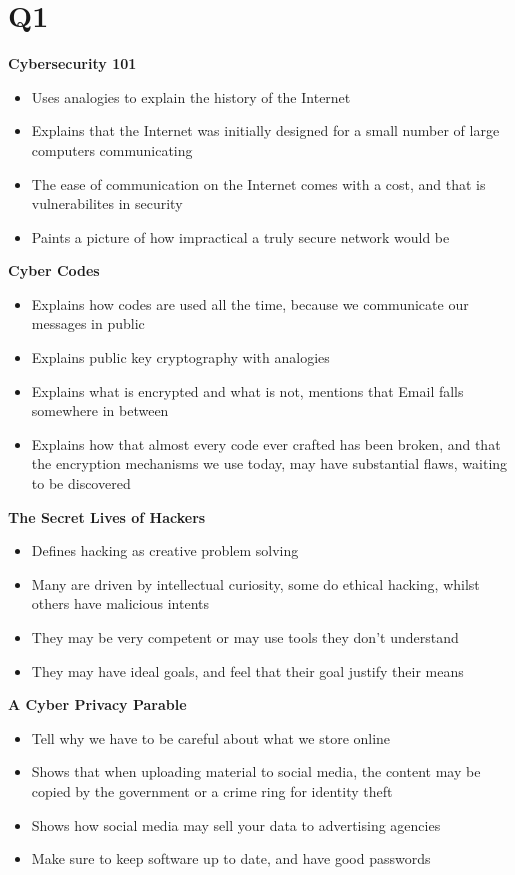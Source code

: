\documentclass{article}
\begin{document}
\section{Q1}
\textbf{Cybersecurity 101}
\begin{itemize}
  \item{Uses analogies to explain the history of the Internet}
  \item{Explains that the Internet was initially designed for a small number of large computers communicating}
  \item{The ease of communication on the Internet comes with a cost, and that is vulnerabilites in security}
  \item{Paints a picture of how impractical a truly secure network would be}
\end{itemize}
\textbf{Cyber Codes}
\begin{itemize}
  \item{Explains how codes are used all the time, because we communicate our messages in public}
  \item{Explains public key cryptography with analogies}
  \item{Explains what is encrypted and what is not, mentions that Email falls somewhere in between}
  \item{Explains how that almost every code ever crafted has been broken, and that the encryption mechanisms we use today, may have substantial flaws, waiting to be discovered}
\end{itemize}
\textbf{The Secret Lives of Hackers}
    \begin{itemize}
      \item{Defines hacking as creative problem solving}
      \item{Many are driven by intellectual curiosity, some do ethical hacking, whilst others have malicious intents}
      \item{They may be very competent or may use tools they don't understand}
      \item{They may have ideal goals, and feel that their goal justify their means}
    \end{itemize}
\textbf{A Cyber Privacy Parable}
\begin{itemize}
      \item{Tell why we have to be careful about what we store online}
      \item{Shows that when uploading material to social media, the content may be copied by the government or a crime ring for identity theft}
      \item{Shows how social media may sell your data to advertising agencies}
      \item{Make sure to keep software up to date, and have good passwords}
\end{itemize}
\end{document}
